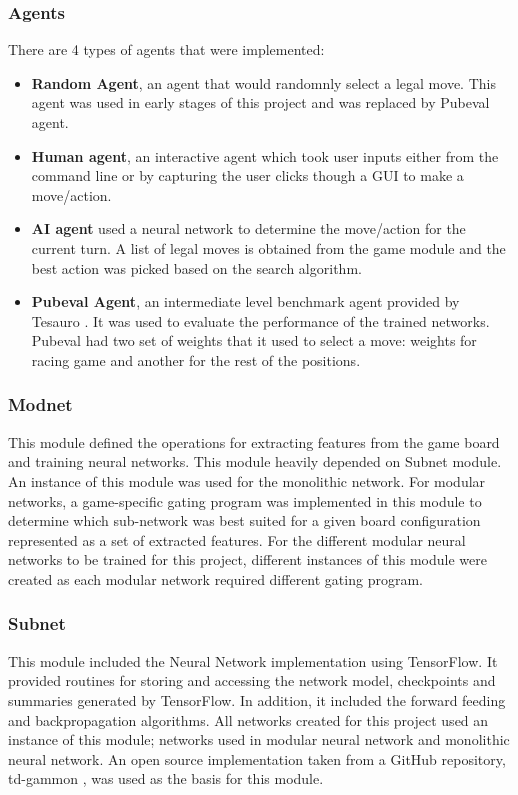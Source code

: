 \documentclass[12pt,a4paper]{article}
\begin{document}
\subsubsection{Agents}
There are 4 types of agents that were implemented: 
\begin{itemize}
    \item \textbf{Random Agent}, an agent that would randomnly select a legal move. This agent was used in early stages of this project and was replaced by Pubeval agent.
    \item \textbf{Human agent}, an interactive agent which took user inputs either from the command line or by capturing the user clicks though a GUI to make a move/action.
    \item \textbf{AI agent} used a neural network to determine the move/action for the current turn. A list of legal moves is obtained from the game module and the best action was picked based on the search algorithm.
    \item \textbf{Pubeval Agent}, an intermediate level benchmark agent provided by Tesauro \citeyear{pubeval}. It was used to evaluate the performance of the trained networks. Pubeval had two set of weights that it used to select a move: weights for racing game and another for the rest of the positions. 
\end{itemize}

\subsubsection{Modnet}
This module defined the operations for extracting features from the game board and training neural networks. This module heavily depended on Subnet module. An instance of this module was used for the monolithic network. For modular networks, a game-specific gating program was implemented in this module to determine which sub-network was best suited for a given board configuration represented as a set of extracted features. For the different modular neural networks to be trained for this project, different instances of this module were created as each modular network required different gating program.

\subsubsection{Subnet}
This module included the Neural Network implementation using TensorFlow. It provided routines for storing and accessing the network model, checkpoints and summaries generated by TensorFlow. In addition, it included the forward feeding and backpropagation algorithms. All networks created for this project used an instance of this module; networks used in modular neural network and monolithic neural network. An open source implementation taken from a GitHub repository, td-gammon \cite{fomorians}, was used as the basis for this module. 
\end{document}
